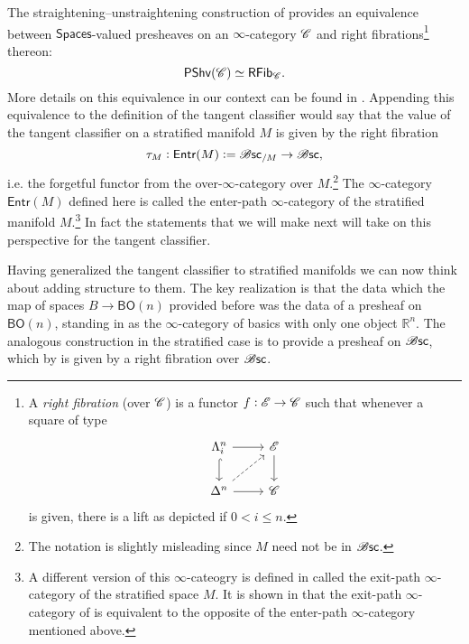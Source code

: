 \documentclass[../text]{subfiles}
\begin{document}
\begin{remark}\label{rem:grothendieck_construction}
    The straightening--unstraightening construction of \cite[§2.2]{lurie_htt} provides an equivalence between $\mathsf{Spaces}$-valued presheaves on an $\infty$-category $\mathscr{C}$ and right fibrations\footnote{A \emph{right fibration} (over $\mathscr{C}$) is a functor $f:\mathscr{E} \rightarrow \mathscr{C}$ such that whenever a square of type
    \begin{equation}
        \begin{tikzcd}[ampersand replacement=\&]
            \Lambda^n_i \arrow[r] \arrow[d, hook] \& \mathscr{E} \arrow[d] \\
            \Delta^n \arrow[r] \arrow[ru, dashed] \& \catC        
        \end{tikzcd}
    \end{equation}
    is given, there is a lift as depicted if $0 < i \leq n$.} thereon:
    \begin{equation}
        \mathsf{PShv}(\mathscr{C}) \simeq \mathsf{RFib}_{\mathscr{C}}.
    \end{equation}
    More details on this equivalence in our context can be found in \cite[§4.2]{aft_localstrut}. Appending this equivalence to the definition of the tangent classifier would say that the value of the tangent classifier on a stratified manifold $M$ is given by the right fibration
    \begin{equation}
        \tau_M: \mathsf{Entr}(M) := \mathscr{B} \mathsf{sc}_{/M} \rightarrow \mathscr{B} \mathsf{sc},
    \end{equation}
    i.e. the forgetful functor from the over-$\infty$-category over $M$.\footnote{The notation is slightly misleading since $M$ need not be in $\mathscr{B} \mathsf{sc}$.} The $\infty$-category $\mathsf{Entr}(M)$ defined here is called the enter-path $\infty$-category of the stratified manifold $M$.\footnote{A different version of this $\infty$-cateogry is defined in \cite[§A.6]{lurie_ha} called the exit-path $\infty$-category of the stratified space $M$. It is shown in \cite{afr_homhyp} that the exit-path $\infty$-category of \cite[§A.6]{lurie_ha} is equivalent to the opposite of the enter-path $\infty$-category mentioned above.} In fact the statements that we will make next will take on this perspective for the tangent classifier.
\end{remark}

Having generalized the tangent classifier to stratified manifolds we can now think about adding structure to them. The key realization is that the data which the map of spaces $B \rightarrow \mathsf{BO}(n)$ provided before was the data of a presheaf on $\mathsf{BO}(n)$, standing in as the $\infty$-category of basics with only one object $\mathbb{R}^n$. The analogous construction in the stratified case is to provide a presheaf on $\mathscr{B} \mathsf{sc}$, which by  is given by a right fibration over $\mathscr{B} \mathsf{sc}$. 
\end{document}
